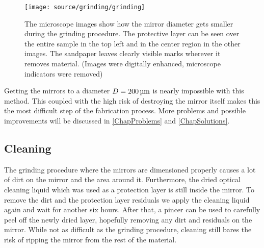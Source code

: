 \begin{figure}[H]
	\texttt{[image: source/grinding/grinding]}
	\caption{The microscope images show how the mirror diameter gets smaller during the grinding procedure. The protective layer can be seen over the entire sample in the top left and in the center region in the other images. The sandpaper leaves clearly visible marks wherever it removes material. (Images were digitally enhanced, microscope indicators were removed)}
	\label{fig:GrindingMicroscope}
\end{figure}
Getting the mirrors to a diameter $D=200\um$ is nearly impossible with this method. This coupled with the high risk of destroying the mirror itself makes this the most difficult step of the fabrication process. More problems and possible improvements will be discussed in \autoref{ChapProblems} and \autoref{ChapSolutions}.

\subsection{Cleaning}
The grinding procedure where the mirrors are dimensioned properly causes a lot of dirt on the mirror and the area around it. Furthermore, the dried optical cleaning liquid which was used as a protection layer is still inside the mirror. To remove the dirt and the protection layer residuals we apply the cleaning liquid again and wait for another six hours. After that, a pincer can be used to carefully peel off the newly dried layer, hopefully removing any dirt and residuals on the mirror. While not as difficult as the grinding procedure, cleaning still bares the risk of ripping the mirror from the rest of the material.

